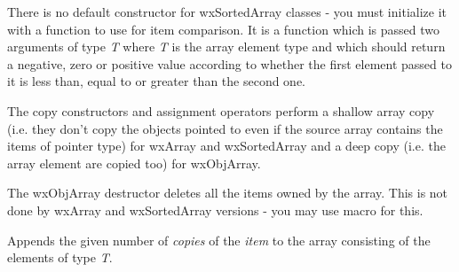 There is no default constructor for wxSortedArray classes - you must initialize it
with a function to use for item comparison. It is a function which is passed
two arguments of type {\it T} where {\it T} is the array element type and which
should return a negative, zero or positive value according to whether the first
element passed to it is less than, equal to or greater than the second one.

\label{wxarrayctorcopy}







The copy constructors and assignment operators perform a shallow array copy
(i.e. they don't copy the objects pointed to even if the source array contains
the items of pointer type) for wxArray and wxSortedArray and a deep copy (i.e.
the array element are copied too) for wxObjArray.

\label{wxarraydtor}




The wxObjArray destructor deletes all the items owned by the array. This is not
done by wxArray and wxSortedArray versions - you may use 
 macro for this.

\label{wxarrayadd}




Appends the given number of {\it copies} of the {\it item} to the array
consisting of the elements of type {\it T}.

